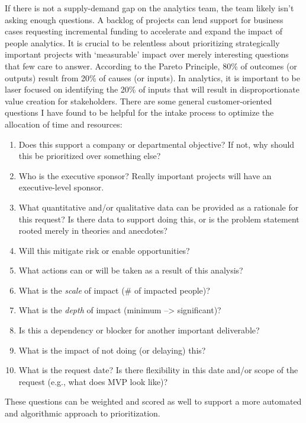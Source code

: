 \documentclass[
]{book}
\providecommand{\tightlist}{%
  \setlength{\itemsep}{0pt}\setlength{\parskip}{0pt}}
\begin{document}
If there is not a supply-demand gap on the analytics team, the team likely isn't asking enough questions. A backlog of projects can lend support for business cases requesting incremental funding to accelerate and expand the impact of people analytics. It is crucial to be relentless about prioritizing strategically important projects with `measurable' impact over merely interesting questions that few care to answer. According to the Pareto Principle, 80\% of outcomes (or outputs) result from 20\% of causes (or inputs). In analytics, it is important to be laser focused on identifying the 20\% of inputs that will result in disproportionate value creation for stakeholders. There are some general customer-oriented questions I have found to be helpful for the intake process to optimize the allocation of time and resources:

\begin{enumerate}
\def\labelenumi{\arabic{enumi}.}
\tightlist
\item
  Does this support a company or departmental objective? If not, why should this be prioritized over something else?
\item
  Who is the executive sponsor? Really important projects will have an executive-level sponsor.
\item
  What quantitative and/or qualitative data can be provided as a rationale for this request? Is there data to support doing this, or is the problem statement rooted merely in theories and anecdotes?
\item
  Will this mitigate risk or enable opportunities?
\item
  What actions can or will be taken as a result of this analysis?
\item
  What is the \emph{scale} of impact (\# of impacted people)?
\item
  What is the \emph{depth} of impact (minimum --\textgreater{} significant)?
\item
  Is this a dependency or blocker for another important deliverable?
\item
  What is the impact of not doing (or delaying) this?
\item
  What is the request date? Is there flexibility in this date and/or scope of the request (e.g., what does MVP look like)?
\end{enumerate}

These questions can be weighted and scored as well to support a more automated and algorithmic approach to prioritization.
\end{document}
